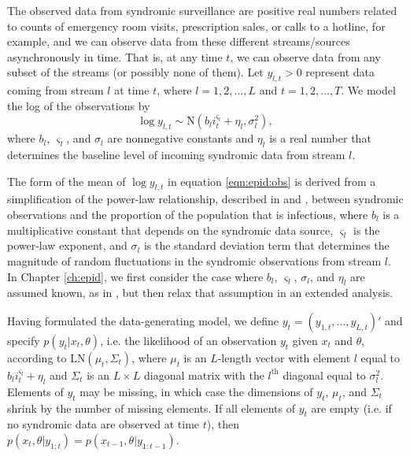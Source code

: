 The observed data from syndromic surveillance are positive real numbers related to counts of emergency room visits, prescription sales, or calls to a hotline, for example, and we can observe data from these different streams/sources asynchronously in time. That is, at any time $t$, we can observe data from any subset of the streams (or possibly none of them). Let $y_{l,t}>0$ represent data coming from stream $l$ at time $t$, where $l = 1,2,\ldots,L$ and $t = 1,2,\ldots,T$. We model the log of the observations by
\begin{equation}
\log y_{l,t} \sim \mbox{N}\left(b_li_t^{\varsigma_l} + \eta_l,\sigma_l^2\right), \label{eqn:epid:obs}
\end{equation}
where $b_l$, $\varsigma_l$, and $\sigma_l$ are nonnegative constants \citep{skvortsov2012monitoring} and $\eta_l$ is a real number that determines the baseline level of incoming syndromic data from stream $l$.

The form of the mean of $\log y_{l,t}$ in equation \eqref{eqn:epid:obs} is derived from a simplification of the power-law relationship, described in \citet{skvortsov2012monitoring} and \citet{Gins:Mohe:Pate:Bram:Smol:Bril:dete:2009}, between syndromic observations and the proportion of the population that is infectious, where $b_l$ is a multiplicative constant that depends on the syndromic data source, $\varsigma_l$ is the power-law exponent, and $\sigma_l$ is the standard deviation term that determines the magnitude of random fluctuations in the syndromic observations from stream $l$. In Chapter \ref{ch:epid}, we first consider the case where $b_l$, $\varsigma_l$, $\sigma_l$, and $\eta_l$ are assumed known, as in \citep{skvortsov2012monitoring}, but then relax that assumption in an extended analysis.

Having formulated the data-generating model, we define $y_t = (y_{1,t},\ldots,y_{L,t})'$ and specify $p(y_t|x_t,\theta)$, i.e. the likelihood of an observation $y_t$ given $x_t$ and $\theta$, according to $\mbox{LN}(\mu_t,\Sigma_t)$, where $\mu_t$ is an $L$-length vector with element $l$ equal to $b_li_t^{\varsigma_l} + \eta_l$ and $\Sigma_t$ is an $L \times L$ diagonal matrix with the $l^{\mbox{th}}$ diagonal equal to $\sigma_l^2$. Elements of $y_t$ may be missing, in which case the dimensions of $y_t$, $\mu_t$, and $\Sigma_t$ shrink by the number of missing elements. If all elements of $y_t$ are empty (i.e. if no syndromic data are observed at time $t$), then $p(x_t,\theta|y_{1:t})=p(x_{t-1},\theta|y_{1:t-1})$.

